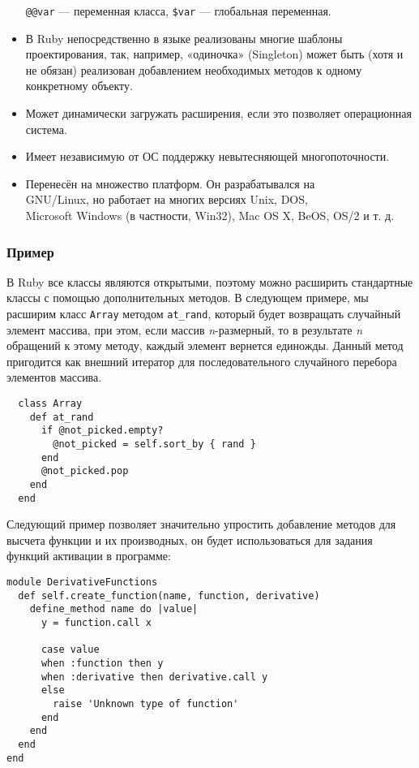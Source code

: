 \documentclass[utf8,a5paper,portrait,10pt,twoside]{eskdtext}
\begin{document}
\begin{itemize}
        \texttt{@@var} — переменная класса, \texttt{\$var} — глобальная
        переменная.
  \item В Ruby непосредственно в языке реализованы многие шаблоны
        проектирования, так, например, «одиночка» (Singleton) может быть (хотя и
        не обязан) реализован добавлением необходимых методов к одному
        конкретному объекту.
  \item Может динамически загружать расширения, если это позволяет операционная
        система.
  \item Имеет независимую от ОС поддержку невытесняющей многопоточности.
  \item Перенесён на множество платформ. Он разрабатывался на\\ GNU/Linux, но
        работает на многих версиях Unix, DOS,\\ Microsoft Windows (в частности,
        Win32), Mac OS X, BeOS, OS/2 и т. д.
\end{itemize}

\subsubsection{Пример}

В Ruby все классы являются открытыми, поэтому можно расширить стандартные классы
с помощью дополнительных методов. В следующем примере, мы расширим класс
\texttt{Array} методом \texttt{at\_rand}, который будет возвращать случайный
элемент массива, при этом, если массив \emph{n}-размерный, то в результате
\emph{n} обращений к этому методу, каждый элемент вернется единожды. Данный
метод пригодится как внешний итератор для последовательного случайного перебора
элементов массива.

\begin{verbatim}
  class Array
    def at_rand
      if @not_picked.empty?
        @not_picked = self.sort_by { rand }
      end
      @not_picked.pop
    end
  end  
\end{verbatim}

Следующий пример позволяет значительно упростить добавление методов для высчета
функции и их производных, он будет использоваться для задания функций активации
в программе: 

\begin{verbatim}
module DerivativeFunctions
  def self.create_function(name, function, derivative)
    define_method name do |value|
      y = function.call x
    
      case value
      when :function then y
      when :derivative then derivative.call y
      else
        raise 'Unknown type of function'
      end
    end
  end
end
\end{verbatim}
\end{document}

